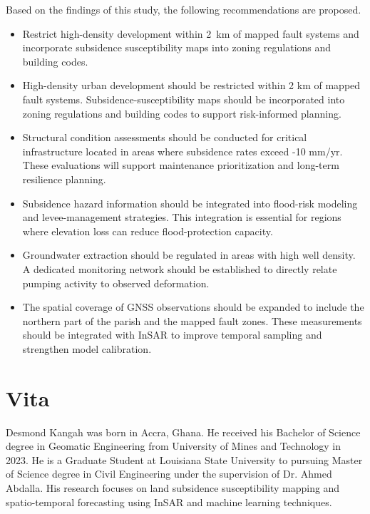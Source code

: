 \documentclass[oneside,doublespacing,flushright]{lsuthesis}
\begin{document}
Based on the findings of this study, the following recommendations are proposed.

\begin{itemize}
    \item Restrict high-density development within 2~km of mapped fault systems and incorporate subsidence susceptibility maps into zoning regulations and building codes.
    \item High-density urban development should be restricted within 2 km of mapped fault systems. Subsidence-susceptibility maps should be incorporated into zoning regulations and building codes to support risk-informed planning.
    \item Structural condition assessments should be conducted for critical infrastructure located in areas where subsidence rates exceed -10 mm/yr. These evaluations will support maintenance prioritization and long-term resilience planning.
    \item Subsidence hazard information should be integrated into flood-risk modeling and levee-management strategies. This integration is essential for regions where elevation loss can reduce flood-protection capacity.
    \item Groundwater extraction should be regulated in areas with high well density. A dedicated monitoring network should be established to directly relate pumping activity to observed deformation.
    \item The spatial coverage of GNSS observations should be expanded to include the northern part of the parish and the mapped fault zones. These measurements should be integrated with InSAR to improve temporal sampling and strengthen model calibration.
\end{itemize}

\backmatter

\printbibliography[title={References}]

\chapter{Vita}

Desmond Kangah was born in Accra, Ghana. He received his Bachelor of Science degree in Geomatic Engineering from University of Mines and Technology in 
2023. He is a Graduate Student at Louisiana State University to pursuing Master of Science degree in Civil Engineering under the supervision of Dr. Ahmed Abdalla. 
His research focuses on land subsidence susceptibility mapping and spatio-temporal forecasting using InSAR and machine learning techniques.
\end{document}
